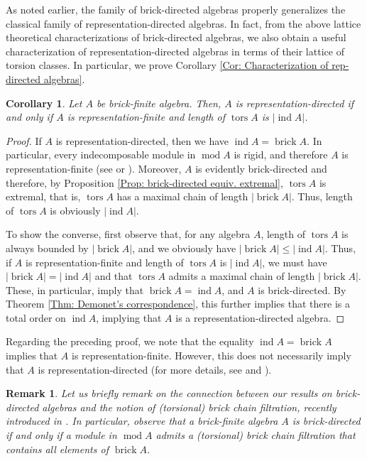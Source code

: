 \documentclass{amsart}
\theoremstyle{thmstyle}
\newtheorem{corollary}[thm]{Corollary}
\theoremstyle{exstyle}
\theoremstyle{defstyle}
\theoremstyle{remstyle}
\newtheorem{remark}[thm]{Remark}
\theoremstyle{remstyle}
\DeclareMathOperator*{\modu}{mod}
\DeclareMathOperator*{\ind}{ind}
\DeclareMathOperator*{\brick}{brick}
\DeclareMathOperator*{\tors}{tors}
\begin{document}
As noted earlier, the family of brick-directed algebras properly generalizes the classical family of representation-directed algebras. In fact, from the above lattice theoretical characterizations of brick-directed algebras, we also obtain a useful characterization of representation-directed algebras in terms of their lattice of torsion classes. In particular, we prove Corollary \ref{Cor: Characterization of rep-directed algebras}.

\begin{corollary}\label{Cor: charact. of rep-directed via brick-directed}
Let $A$ be brick-finite algebra. Then, $A$ is representation-directed if and only if $A$ is representation-finite and length of $\tors A$ is $|{\ind A}|$.
\end{corollary}
\begin{proof}
If $A$ is representation-directed, then we have $\ind A=\brick A$. In particular, every indecomposable module in $\modu A$ is rigid, and therefore $A$ is representation-finite (see \cite{Dr} or \cite{MP1}). Moreover, $A$ is evidently brick-directed and therefore, by Proposition \ref{Prop: brick-directed equiv. extremal}, $\tors A$ is extremal, that is, $\tors A$ has a maximal chain of length $|{\brick A}|$. Thus, length of $\tors A$ is obviously $|{\ind A}|$.

To show the converse, first observe that, for any algebra $A$, length of $\tors A$ is always bounded by $|{\brick A}|$, and we obviously have  $|{\brick A}|\leq |{\ind A}|$. Thus, if $A$ is representation-finite and length of $\tors A$ is $|{\ind A}|$, we must have $|{\brick A}|=|{\ind A}|$ and that $\tors A$ admits a maximal chain of length $|{\brick A}|$. These, in particular, imply that $\brick A=\ind A$, and $A$ is brick-directed. By Theorem \ref{Thm: Demonet's correspondence}, this further implies that there is a total order on $\ind A$, implying that $A$ is a representation-directed algebra.
\end{proof}

Regarding the preceding proof, we note that the equality $\ind A=\brick A$ implies that $A$ is representation-finite. However, this does not necessarily imply that $A$ is representation-directed (for more details, see \cite{Dr} and \cite{MP1}).

\begin{remark}
Let us briefly remark on the connection between our results on brick-directed algebras and the notion of (torsional) brick chain filtration, recently introduced in \cite{Ri1}. 
In particular, observe that a brick-finite algebra $A$ is brick-directed if and only if a module in $\modu A$ admits a (torsional) brick chain filtration that contains all elements of $\brick A$.
\end{remark}
\end{document}
